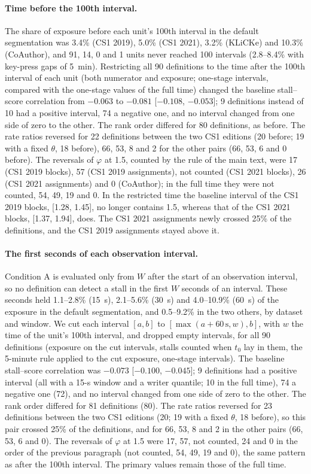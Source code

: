 \paragraph{Time before the 100th interval.} The share of exposure before each unit's 100th interval in the default
segmentation was 3.4\% (CS1 2019), 5.0\% (CS1 2021), 3.2\% (KLiCKe) and 10.3\% (CoAuthor), and 91, 14, 0 and 1 units
never reached 100 intervals (2.8--8.4\% with key-press gaps of 5~min). Restricting all 90 definitions to the time after the
100th interval of each unit (both numerator and exposure; one-stage intervals, compared with the one-stage values of
the full time) changed the baseline stall--score correlation from $-0.063$ to $-0.081$ [$-0.108$, $-0.053$]; 9
definitions instead of 10 had a positive interval, 74 a negative one, and no interval changed from one side of zero to
the other. The rank order differed for 80 definitions, as before. The rate ratios reversed for 22 definitions between
the two CS1 editions (20 before; 19 with a fixed $\theta$, 18 before), 66, 53, 8 and 2 for the other pairs (66, 53, 6
and 0 before). The reversals of $\varphi$ at 1.5, counted by the rule of
the main text, were 17 (CS1 2019 blocks), 57 (CS1 2019 assignments), not counted (CS1 2021 blocks), 26 (CS1 2021
assignments) and 0 (CoAuthor); in the full time they were not counted, 54, 49, 19 and 0. In the restricted time the
baseline interval of the CS1 2019 blocks, [1.28, 1.45], no longer contains 1.5, whereas that of the CS1 2021 blocks,
[1.37, 1.94], does. The CS1 2021 assignments newly crossed 25\% of the definitions, and the CS1 2019 assignments stayed above it.

\paragraph{The first seconds of each observation interval.} Condition A is evaluated only from $W$ after the start of
an observation interval, so no definition can detect a stall in the first $W$ seconds of an interval. These seconds
held 1.1--2.8\% (15~s), 2.1--5.6\% (30~s) and 4.0--10.9\% (60~s) of the exposure in the default segmentation, and
0.5--9.2\% in the two others, by dataset and window. We cut each interval $[a, b]$ to $[\max(a + 60\,\mathrm{s}, w), b]$,
with $w$ the time of the unit's 100th interval, and dropped empty intervals, for all 90 definitions (exposure on the
cut intervals, stalls counted when $t_0$ lay in them, the 5-minute rule applied to the cut exposure, one-stage
intervals). The baseline stall--score correlation was $-0.073$ [$-0.100$, $-0.045$]; 9 definitions had a positive
interval (all with a 15-s window and a writer quantile; 10 in the full time), 74 a negative one (72), and no interval
changed from one side of zero to the other. The rank order differed for 81 definitions (80). The rate ratios reversed
for 23 definitions between the two CS1 editions (20; 19 with a fixed $\theta$, 18 before), so this pair crossed 25\%
of the definitions, and for 66, 53, 8 and 2 in the other pairs (66, 53, 6 and 0). The reversals of $\varphi$ at 1.5
were 17, 57, not counted, 24 and 0 in the order of the previous paragraph (not counted, 54, 49, 19 and 0), the same
pattern as after the 100th interval. The primary values remain those of the full time.

